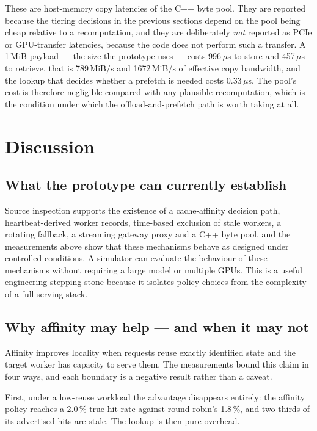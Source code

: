 \documentclass[10pt,twocolumn]{article}
\begin{document}


These are host-memory copy latencies of the C++ byte pool. They are reported
because the tiering decisions in the previous sections depend on the pool
being cheap relative to a recomputation, and they are deliberately \emph{not}
reported as PCIe or GPU-transfer latencies, because the code does not perform
such a transfer. A 1\,MiB payload --- the size the prototype uses --- costs
996\,$\mu$s to store and 457\,$\mu$s to retrieve, that is 789\,MiB/s and
1672\,MiB/s of effective copy bandwidth, and the lookup that decides whether a
prefetch is needed costs 0.33\,$\mu$s. The pool's cost is therefore negligible
compared with any plausible recomputation, which is the condition under which
the offload-and-prefetch path is worth taking at all.

\section{Discussion}

\subsection{What the prototype can currently establish}

Source inspection supports the existence of a cache-affinity decision path,
heartbeat-derived worker records, time-based exclusion of stale workers, a
rotating fallback, a streaming gateway proxy and a C++ byte pool, and the
measurements above show that these mechanisms behave as designed under
controlled conditions. A simulator can evaluate the behaviour of these
mechanisms without requiring a large model or multiple GPUs. This is a useful
engineering stepping stone because it isolates policy choices from the
complexity of a full serving stack.

\subsection{Why affinity may help --- and when it may not}

Affinity improves locality when requests reuse exactly identified state and
the target worker has capacity to serve them. The measurements bound this
claim in four ways, and each boundary is a negative result rather than a
caveat.

First, under a low-reuse workload the advantage disappears entirely: the
affinity policy reaches a 2.0\,\% true-hit rate against round-robin's
1.8\,\%, and two thirds of its advertised hits are stale. The lookup is then
pure overhead.
\end{document}
